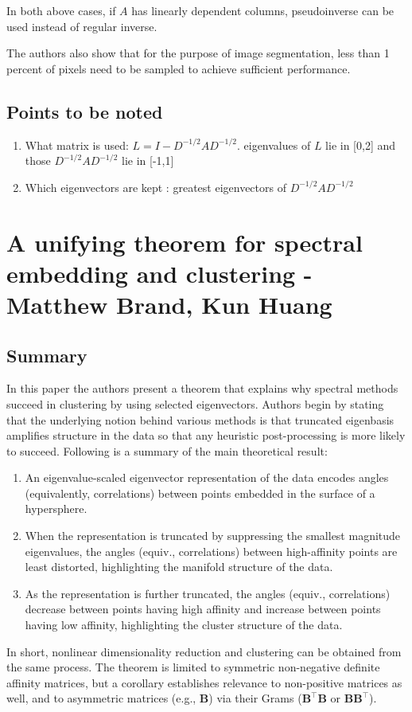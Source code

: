 \documentclass[10pt,a4paper,twoside]{report}
\theoremstyle{definition}
\begin{document}
	In both above cases, if $A$ has linearly dependent columns, pseudoinverse can be used instead of regular inverse.
	
	The authors also show that for the purpose of image segmentation, less than 1 percent of pixels need to be sampled to achieve sufficient performance.
	
	\section*{Points to be noted}
	\begin{enumerate}
		\item What matrix is used: $L = I -  D^{-1/2}AD^{-1/2}$. eigenvalues of $L$ lie in [0,2] and those $D^{-1/2}AD^{-1/2}$ lie in [-1,1]
		\item Which eigenvectors are kept : greatest eigenvectors of $D^{-1/2}AD^{-1/2}$
		
	\end{enumerate}
	
	
	\chapter*{A unifying theorem for spectral embedding and clustering - Matthew Brand, Kun Huang}
	\section*{Summary}
	In this paper the authors present a theorem that explains why spectral methods succeed in clustering by using selected eigenvectors. Authors begin by stating that the underlying notion behind various methods is that truncated eigenbasis amplifies structure in the data so that any heuristic post-processing is more likely to succeed. Following is a summary of the main theoretical result:
	\begin{enumerate}
		\item An eigenvalue-scaled eigenvector representation of the data encodes angles (equivalently, correlations) between points embedded in the surface of a hypersphere. 
		\item When the representation is truncated by suppressing the smallest magnitude eigenvalues, the angles (equiv., correlations) between high-affinity points are least distorted, highlighting the manifold structure of the data.
		\item As the representation is further truncated, the angles (equiv., correlations) decrease between points having high affinity and increase between points having low affinity, highlighting the cluster structure of the data.
	\end{enumerate}
	In short, nonlinear dimensionality reduction and clustering can be obtained from the same process. The theorem is limited to symmetric non-negative definite affinity matrices, but a corollary establishes relevance to non-positive matrices as well, and to asymmetric matrices (e.g., \textbf{B}) via their Grams ($\mathbf{B}^\top\mathbf{B}$ or $\mathbf{BB}^\top$).
		
\end{document}
